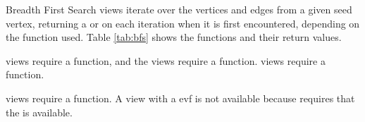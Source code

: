 Breadth First Search views iterate over the vertices and edges from a given seed vertex, returning a  
or  on each iteration when it is first encountered, depending on the function used. 
Table \ref{tab:bfs} shows the functions and their return values.


 views require a  function, and the  views require a  function.
 views require a  function.

 views require a  function. 
A  view with a evf is not available because  requires that the  is available.


